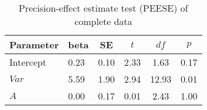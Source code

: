 \begin{table}[ht]
\centering
\caption{Precision-effect estimate test (PEESE) of complete data} 
\label{tab:PEESE}
\begingroup\small
\begin{tabular}{llcccc}
  \hline
Parameter & beta & SE & $t$ & $df$ & $p$ \\ 
  \hline
Intercept & 0.23 & 0.10 & 2.33 & 1.63 & 0.17 \\ 
  $Var$ & 5.59 & 1.90 & 2.94 & 12.93 & 0.01 \\ 
  $A$ & 0.00 & 0.17 & 0.01 & 2.43 & 1.00 \\ 
   \hline
\end{tabular}
\endgroup
\end{table}
